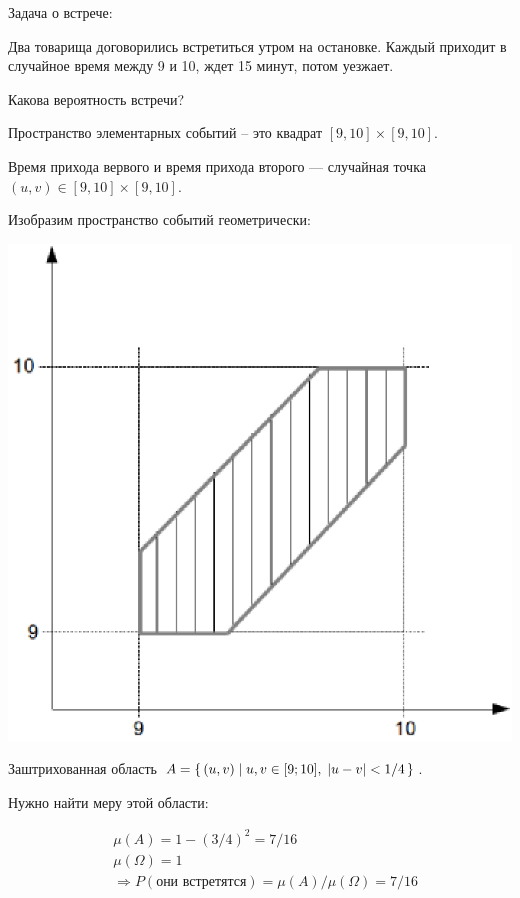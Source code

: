 \begin{example}
	Задача о встрече:
	
	Два товарища договорились встретиться утром на остановке. Каждый приходит в случайное время между 9 и 10, ждет 15 минут, потом уезжает.

	Какова вероятность встречи?\\

	\begin{solution}
		Пространство элементарных событий -- это квадрат $[9, 10] \times [9, 10]$.

		Время прихода вервого и время прихода второго --- случайная точка $(u, v) \in [9, 10] \times [9, 	10]$.

		Изобразим пространство событий геометрически:

		\includegraphics{pictures/13_09_graph.eps}

		Заштрихованная область $A = \left\{ \, (u, v) \mid u, v \in [9; 10],\; |u - v| < 1/4  \, \right\}$.

		Нужно найти меру этой области:

		\begin{align*}
			&\mu(A) = 1 - (3/4)^2 = 7/16\\
			&\mu(\Omega) = 1\\
			&\Rightarrow P(\text{они встретятся}) = \mu(A) / \mu(\Omega) = 7/16\\
		\end{align*}

	\end{solution}
\end{example}

